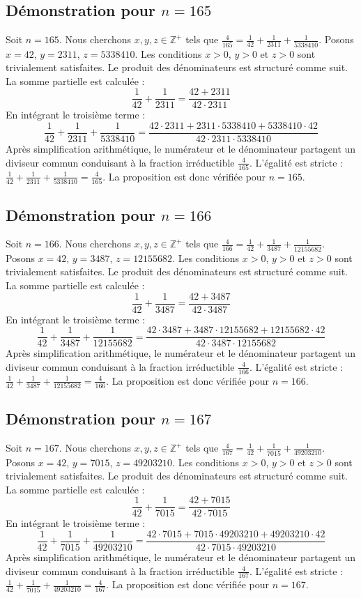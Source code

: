 \documentclass[11pt,a4paper]{article}
\begin{document}
\subsection{Démonstration pour $n = 165$}
Soit $n = 165$. Nous cherchons $x, y, z \in \mathbb{Z}^{+}$ tels que $\frac{4}{165} = \frac{1}{42} + \frac{1}{2311} + \frac{1}{5338410}$.
Posons $x = 42$, $y = 2311$, $z = 5338410$.
Les conditions $x > 0$, $y > 0$ et $z > 0$ sont trivialement satisfaites.
Le produit des dénominateurs est structuré comme suit. La somme partielle est calculée :
$$ \frac{1}{42} + \frac{1}{2311} = \frac{42+2311}{42 \cdot 2311} $$
En intégrant le troisième terme :
$$ \frac{1}{42} + \frac{1}{2311} + \frac{1}{5338410} = \frac{42 \cdot 2311 + 2311 \cdot 5338410 + 5338410 \cdot 42}{42 \cdot 2311 \cdot 5338410} $$
Après simplification arithmétique, le numérateur et le dénominateur partagent un diviseur commun conduisant à la fraction irréductible $\frac{4}{165}$.
L'égalité est stricte : $\frac{1}{42} + \frac{1}{2311} + \frac{1}{5338410} = \frac{4}{165}$.
La proposition est donc vérifiée pour $n = 165$.
\subsection{Démonstration pour $n = 166$}
Soit $n = 166$. Nous cherchons $x, y, z \in \mathbb{Z}^{+}$ tels que $\frac{4}{166} = \frac{1}{42} + \frac{1}{3487} + \frac{1}{12155682}$.
Posons $x = 42$, $y = 3487$, $z = 12155682$.
Les conditions $x > 0$, $y > 0$ et $z > 0$ sont trivialement satisfaites.
Le produit des dénominateurs est structuré comme suit. La somme partielle est calculée :
$$ \frac{1}{42} + \frac{1}{3487} = \frac{42+3487}{42 \cdot 3487} $$
En intégrant le troisième terme :
$$ \frac{1}{42} + \frac{1}{3487} + \frac{1}{12155682} = \frac{42 \cdot 3487 + 3487 \cdot 12155682 + 12155682 \cdot 42}{42 \cdot 3487 \cdot 12155682} $$
Après simplification arithmétique, le numérateur et le dénominateur partagent un diviseur commun conduisant à la fraction irréductible $\frac{4}{166}$.
L'égalité est stricte : $\frac{1}{42} + \frac{1}{3487} + \frac{1}{12155682} = \frac{4}{166}$.
La proposition est donc vérifiée pour $n = 166$.
\subsection{Démonstration pour $n = 167$}
Soit $n = 167$. Nous cherchons $x, y, z \in \mathbb{Z}^{+}$ tels que $\frac{4}{167} = \frac{1}{42} + \frac{1}{7015} + \frac{1}{49203210}$.
Posons $x = 42$, $y = 7015$, $z = 49203210$.
Les conditions $x > 0$, $y > 0$ et $z > 0$ sont trivialement satisfaites.
Le produit des dénominateurs est structuré comme suit. La somme partielle est calculée :
$$ \frac{1}{42} + \frac{1}{7015} = \frac{42+7015}{42 \cdot 7015} $$
En intégrant le troisième terme :
$$ \frac{1}{42} + \frac{1}{7015} + \frac{1}{49203210} = \frac{42 \cdot 7015 + 7015 \cdot 49203210 + 49203210 \cdot 42}{42 \cdot 7015 \cdot 49203210} $$
Après simplification arithmétique, le numérateur et le dénominateur partagent un diviseur commun conduisant à la fraction irréductible $\frac{4}{167}$.
L'égalité est stricte : $\frac{1}{42} + \frac{1}{7015} + \frac{1}{49203210} = \frac{4}{167}$.
La proposition est donc vérifiée pour $n = 167$.
\end{document}

